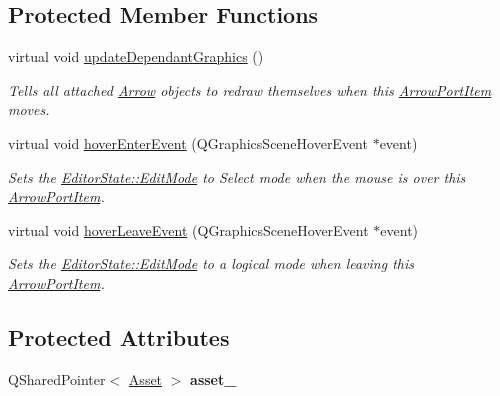 \subsection*{Protected Member Functions}
\begin{DoxyCompactItemize}
\item 
\hypertarget{class_arrow_port_item_a7e0651b2ab182947db2b983bec211602}{virtual void \hyperlink{class_arrow_port_item_a7e0651b2ab182947db2b983bec211602}{update\-Dependant\-Graphics} ()}\label{class_arrow_port_item_a7e0651b2ab182947db2b983bec211602}

\begin{DoxyCompactList}\small\item\em Tells all attached \hyperlink{class_arrow}{Arrow} objects to redraw themselves when this \hyperlink{class_arrow_port_item}{Arrow\-Port\-Item} moves. \end{DoxyCompactList}\item 
\hypertarget{class_arrow_port_item_ac8365305e57f311dd1a673d8c8ff92a9}{virtual void \hyperlink{class_arrow_port_item_ac8365305e57f311dd1a673d8c8ff92a9}{hover\-Enter\-Event} (Q\-Graphics\-Scene\-Hover\-Event $\ast$event)}\label{class_arrow_port_item_ac8365305e57f311dd1a673d8c8ff92a9}

\begin{DoxyCompactList}\small\item\em Sets the \hyperlink{class_editor_state_a30123e595784b2228edc2a0c2b46ab28}{Editor\-State\-::\-Edit\-Mode} to Select mode when the mouse is over this \hyperlink{class_arrow_port_item}{Arrow\-Port\-Item}. \end{DoxyCompactList}\item 
\hypertarget{class_arrow_port_item_a12ee0e3740c3e6fbb303774232278013}{virtual void \hyperlink{class_arrow_port_item_a12ee0e3740c3e6fbb303774232278013}{hover\-Leave\-Event} (Q\-Graphics\-Scene\-Hover\-Event $\ast$event)}\label{class_arrow_port_item_a12ee0e3740c3e6fbb303774232278013}

\begin{DoxyCompactList}\small\item\em Sets the \hyperlink{class_editor_state_a30123e595784b2228edc2a0c2b46ab28}{Editor\-State\-::\-Edit\-Mode} to a logical mode when leaving this \hyperlink{class_arrow_port_item}{Arrow\-Port\-Item}. \end{DoxyCompactList}\end{DoxyCompactItemize}
\subsection*{Protected Attributes}
\begin{DoxyCompactItemize}
\item 
\hypertarget{class_arrow_port_item_a12b60fef163ec80026c59fe7fce41421}{Q\-Shared\-Pointer$<$ \hyperlink{class_picto_1_1_asset}{Asset} $>$ {\bfseries asset\-\_\-}}\label{class_arrow_port_item_a12b60fef163ec80026c59fe7fce41421}

\end{DoxyCompactItemize}
